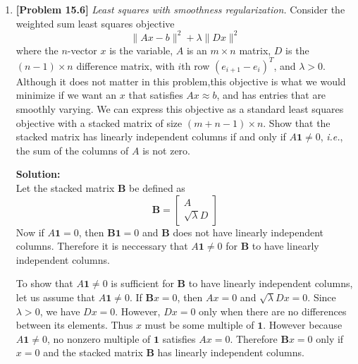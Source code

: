 \begin{enumerate}[label=(\alph*)]
	\item \textbf{[Problem 15.6]} \textit{Least squares with smoothness
		      regularization.} Consider the weighted sum least squares objective
	      $$ \parallel Ax - b \parallel^2 + \lambda \parallel Dx \parallel^2$$
	      where the $n$-vector $x$ is the variable, $A$ is an $m \times n$
	      matrix, $D$ is the $(n - 1) \times n$ difference matrix, with $i$th
	      row $(e_{i + 1} - e_i)^T$, and $\lambda > 0$. Although it does not
	      matter in this problem,this objective is what we would minimize if we
	      want an $x$ that satisfies $Ax \approx b$, and has entries that are
	      smoothly varying. We can express this objective as a standard least
	      squares objective with a stacked matrix  of size $(m + n - 1) \times
		      n$.
	      Show that the stacked matrix has linearly independent columns if and
	      only if $A \mathbf{1} \neq 0$, \textit{i.e.}, the sum of the columns
	      of $A$ is not zero.

	      \begin{tcolorbox}
		      \textbf{Solution:} \\
		      Let the stacked matrix $\mathbf{B}$ be defined as
		      $$ \mathbf{B} = \begin{bmatrix}
				      A \\
				      \sqrt{\lambda} D
			      \end{bmatrix} $$
		      Now if $A \mathbf{1} = 0$, then $\mathbf{B} \mathbf{1} = 0$
		      and $\mathbf{B}$ does not have linearly independent columns.
		      Therefore it is neccessary that $A \mathbf{1} \neq 0$ for
		      $\mathbf{B}$ to have linearly independent columns.

		      To show that $A \mathbf{1} \neq 0$ is sufficient for $\mathbf{B}$
		      to have linearly independent columns, let us assume that $A
			      \mathbf{1} \neq 0$. If $\mathbf{B}x = 0$, then $Ax = 0$ and
		      $\sqrt{\lambda} Dx = 0$. Since $\lambda > 0$, we have $Dx = 0$.
		      However, $Dx = 0$ only when there are no differences between its
		      elements. Thus $x$ must be some multiple of $\mathbf{1}$. However
		      because $A \mathbf{1} \neq 0$, no nonzero multiple of $\mathbf{1}$
		      satisfies $Ax = 0$. Therefore $\mathbf{B}x = 0$ only if $x = 0$
		      and the stacked matrix $\mathbf{B}$ has linearly independent
		      columns.
	      \end{tcolorbox}


\end{enumerate}

